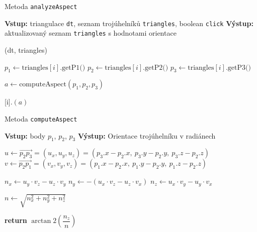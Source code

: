 \begin{algorithm}
    \caption{Metoda \texttt{analyzeAspect}}
    \begin{algorithmic}[1]
        \STATE \textbf{Vstup:} triangulace \texttt{dt}, seznam trojúhelníků \texttt{triangles}, boolean \texttt{click}
        \STATE \textbf{Výstup:} aktualizovaný seznam \texttt{triangles} s hodnotami orientace

            \STATE {}(dt, triangles)
        \ENDIF

            \STATE $p_1 \gets \text{triangles}[i].\text{getP1()}$
            \STATE $p_2 \gets \text{triangles}[i].\text{getP2()}$
            \STATE $p_3 \gets \text{triangles}[i].\text{getP3()}$

            \STATE $a \gets \text{computeAspect}(p_1, p_2, p_3)$

            \STATE {}[i].$(a)$
        \ENDFOR
    \end{algorithmic}
\end{algorithm}

\begin{algorithm}
    \caption{Metoda \texttt{computeAspect}}
    \begin{algorithmic}[1]
        \STATE \textbf{Vstup:} body $p_1$, $p_2$, $p_3$
        \STATE \textbf{Výstup:} Orientace trojúhelníku v radiánech

        \STATE $u \gets \vec{p_2p_3} = (u_x, u_y, u_z) = (p_3.x - p_2.x,\ p_3.y - p_2.y,\ p_3.z - p_2.z)$
        \STATE $v \gets \vec{p_2p_1} = (v_x, v_y, v_z) = (p_1.x - p_2.x,\ p_1.y - p_2.y,\ p_1.z - p_2.z)$

        \STATE $n_x \gets u_y \cdot v_z - u_z \cdot v_y$
        \STATE $n_y \gets -(u_x \cdot v_z - u_z \cdot v_x)$
        \STATE $n_z \gets u_x \cdot v_y - u_y \cdot v_x$

        \STATE $n \gets \sqrt{n_x^2 + n_y^2 + n_z^2}$ 

        \STATE \textbf{return} $\arctan2 \left(\dfrac{n_z}{n}\right)$
    \end{algorithmic}
\end{algorithm}